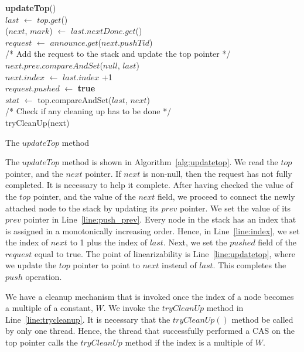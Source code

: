 \documentclass{llncs}
\begin{document}
\vspace{-8mm}
\begin{algorithm}
\scriptsize
\SetAlgoLined	
\textbf{updateTop}(){}\\
		$last$ $\leftarrow$ $top.get$()\\
		($next$, $mark$) $\leftarrow$ $last.nextDone.get$()\\
		{
	    	$request$ $\leftarrow$ $announce.get$($next$.$pushTid$) \\
			{
/* Add the request to the stack and update the top pointer */ \\
				$next.prev.compareAndSet$($null$, $last$) \label{line:push_prev} \\
				$next.index$ $\leftarrow$ $last.index$ +1 \label{line:index}\\
				$request.pushed$ $\leftarrow$ \textbf{true} \label{line:announce} \\
				$stat$ $\leftarrow$ top.compareAndSet($last$, $next$) \label{line:updatetop} \\
/* Check if any cleaning up has to be done */ \\
				{
					tryCleanUp(next) \label{line:trycleanup}
				}
			}
		}
\caption{The $updateTop$ method} \label{alg:updatetop} 
\end{algorithm}


\vspace{-8mm}
\normalsize
The $updateTop$ method is shown in Algorithm~\ref{alg:updatetop}. We read the $top$ pointer, and the $next$ 
pointer. If $next$ is non-null, then the request has not fully completed. It is necessary to help it complete. 
After having checked the value of the $top$ pointer, and the value of the $next$ field, we proceed to connect 
the newly attached node to the stack by updating its $prev$ pointer. We set the value of its $prev$ pointer in 
Line~\ref{line:push_prev}. Every node in the stack has an index that is assigned in a monotonically increasing 
order. Hence, in Line~\ref{line:index}, we set the index of $next$ to 1 plus the index of $last$.
Next, we set the $pushed$ field 
of the $request$ equal to true. The point of
linearizability is Line~\ref{line:updatetop}, 
where we update the $top$ pointer to point to $next$ instead of
$last$. This completes the $push$ operation. 

We have a cleanup mechanism that is invoked once the index of a node becomes a multiple of a constant, $W$. 
We invoke the $tryCleanUp$ method in Line~\ref{line:trycleanup}. It is necessary that the $tryCleanUp()$ method
be called by only one thread.  Hence, the thread that successfully performed a CAS on the top pointer
calls the $tryCleanUp$ method if the index is a multiple of $W$. 
\end{document}
